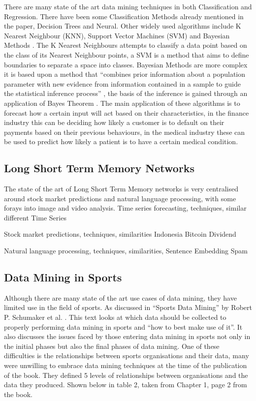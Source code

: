 \documentclass{imc-inf}
\begin{document}
	There are many state of the art data mining techniques in both Classification and Regression. There have been some Classification Methods already mentioned in the paper, Decision Trees and Neural. Other widely used algorithms include K Nearest Neighbour (KNN), Support Vector Machines (SVM) and Bayesian Methods \cite{SOTA}. The K Nearest Neighbours attempts to classify a data point based on the class of its Nearest Neighbour points, a SVM is a method that aims to define boundaries to separate a space into classes. Bayesian Methods are more complex it is based upon a method that “combines prior information about a population parameter with new evidence from information contained in a sample to guide the statistical inference process” \cite{website:Britannica}, the basis of the inference is gained through an application of Bayes Theorem \cite{website:Britannica}. The main application of these algorithms is to forecast how a certain input will act based on their characteristics, in the finance industry this can be deciding how likely a customer is to default on their payments based on their previous behaviours, in the medical industry these can be used to predict how likely a patient is to have a certain medical condition.
	
	\subsection{Long Short Term Memory Networks}	
	The state of the art of Long Short Term Memory networks is very centralised around stock market predictions and natural language processing, with some forays into image and video analysis. 
	Time series forecasting, techniques, similar different
	Time Series \cite{10.1145/3453800.3453812}
	
	Stock market predictions, techniques, similarities 
	Indonesia\cite{10.1145/3568231.3568249}
	Bitcoin \cite{10.1145/3546157.3546162}
	Dividend \cite{10.1145/3474880.3474898}
	
	Natural language processing, techniques, similarities, 
	Sentence Embedding \cite{10.1109/TASLP.2016.2520371}
	Spam \cite{10.1145/3234781.3234794}
	
	\subsection{Data Mining in Sports}
	Although there are many state of the art use cases of data mining, they have limited use in the field of sports. As discussed in “Sports Data Mining” by Robert P. Schumaker et al. \cite{SportDM}. This text looks at which data should be collected to properly performing data mining in sports and “how to best make use of it”. It also discusses the issues faced by those entering data mining in sports not only in the initial phases but also the final phases of data mining. One of these difficulties is the relationships between sports organisations and their data, many were unwilling to embrace data mining techniques at the time of the publication of the book. They defined 5 levels of relationships between organisations and the data they produced. Shown below in table 2, taken from Chapter 1, page 2 from the book.
	
\end{document}
